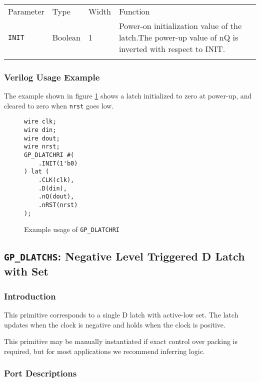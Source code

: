 \documentclass[11pt]{article}
\newcommand{\tokenstyle}[1]{\texttt{#1}}
\newcommand{\wirestyle}[1]{\texttt{#1}}
\newcommand{\whenstyle}[1]{{\fontseries{sb}\selectfont#1}}
\newcommand{\thinhline}{\Xhline{1\arrayrulewidth}}
\newcommand{\thickhline}{\Xhline{2.5\arrayrulewidth}}
\begin{document}
\begin{tabularx}{\textwidth}{lllX}
\thinhline
\whenstyle{Parameter} & \whenstyle{Type} & \whenstyle{Width} & \whenstyle{Function} \\
\thickhline
\tokenstyle{INIT} & Boolean & 1 & Power-on initialization value of the latch.\newline The power-up value of nQ is
inverted with respect to INIT.\\
\thinhline
\end{tabularx}

\subsubsection{Verilog Usage Example}

The example shown in figure \ref{gp-dlatchri-example} shows a latch initialized to zero at power-up, and cleared to zero
when \wirestyle{nrst} goes low.

\begin{figure}[h]
\begin{lstlisting}
wire clk;
wire din;
wire dout;
wire nrst;
GP_DLATCHRI #(
	.INIT(1'b0)
) lat (
	.CLK(clk),
	.D(din),
	.nQ(dout),
	.nRST(nrst)
);
\end{lstlisting}
\caption{Example usage of \tokenstyle{GP\_DLATCHRI}}
\label{gp-dlatchri-example}
\end{figure}


\pagebreak
\subsection{\tokenstyle{GP\_DLATCHS}: Negative Level Triggered D Latch with Set}
\label{gp-latchs}

\subsubsection{Introduction}
This primitive corresponds to a single D latch with active-low set. The latch updates when the clock is negative and holds
when the clock is positive.

This primitive may be manually instantiated if exact control over packing is required, but for most applications we
recommend inferring logic.

\subsubsection{Port Descriptions}
\end{document}
